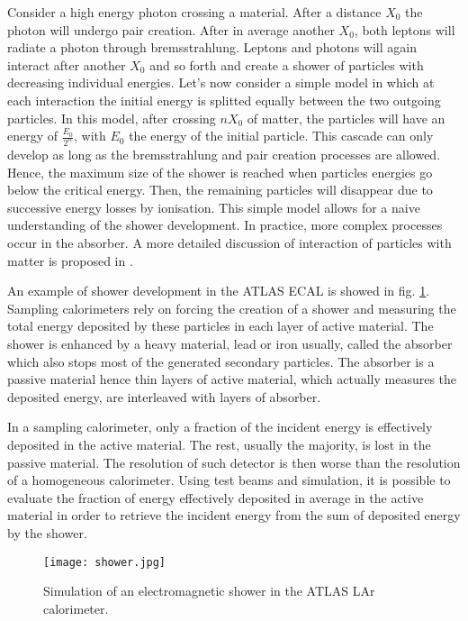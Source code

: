 Consider a high energy photon crossing a material.
After a distance $X_0$ the photon will undergo pair creation.
After in average another $X_0$, both leptons will radiate a photon through bremsstrahlung.
Leptons and photons will again interact after another $X_0$ and so forth and create a shower of particles with decreasing individual energies.
Let's now consider a simple model in which at each interaction the initial energy is splitted equally between the two outgoing particles.
In this model, after crossing $nX_0$ of matter, the particles will have an energy of $\frac{E_0}{2^n}$, with $E_0$ the energy of the initial particle.
This cascade can only develop as long as the bremsstrahlung and pair creation processes are allowed.
Hence, the maximum size of the shower is reached when particles energies go below the critical energy.
Then, the remaining particles will disappear due to successive energy losses by ionisation.
This simple model allows for a naive understanding of the shower development.
In practice, more complex processes occur in the absorber.
A more detailed discussion of interaction of particles with matter is proposed in \cite{PDG2016}.

An example of shower development in the ATLAS ECAL is showed in fig. \ref{fig:org2e447b3}.
Sampling calorimeters rely on forcing the creation of a shower and measuring the total energy deposited by these particles in each layer of active material.
The shower is enhanced by a heavy material, lead or iron usually, called the absorber which also stops most of the generated secondary particles.
The absorber is a passive material hence thin layers  of active material, which actually measures the deposited energy, are interleaved with layers of absorber.

In a sampling calorimeter, only a fraction of the incident energy is effectively deposited in the active material.
The rest, usually the majority, is lost in the passive material.
The resolution of such detector is then worse than the resolution of a homogeneous calorimeter.
Using test beams and simulation, it is possible to evaluate the fraction of energy effectively deposited in average in the active material in order to retrieve the incident energy from the sum of deposited energy by the shower.

\begin{figure}[htbp]
\centering
\texttt{[image: shower.jpg]}
\caption{\label{fig:org2e447b3}
Simulation of an electromagnetic shower in the ATLAS LAr calorimeter.}
\end{figure}


